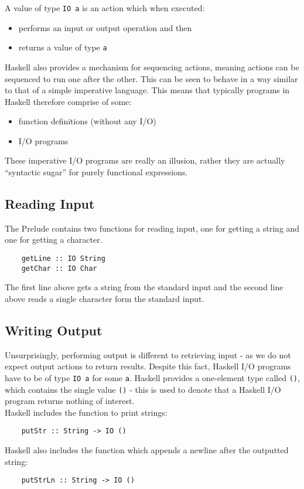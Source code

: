 A value of type \verb|IO a| is an action which when executed:
\begin{itemize}
    \item performs an input or output operation and then
    \item returns a value of type \verb|a|
\end{itemize}
Haskell also provides a mechanism for sequencing actions, meaning actions can be sequenced to run one after the other. This can be seen to behave in a way similar to that of a simple imperative language. This means that typically programs in Haskell therefore comprise of some:
\begin{itemize}
    \item function definitions (without any I/O)
    \item I/O programs
\end{itemize}
These imperative I/O programs are really an illusion, rather they are actually ``syntactic sugar'' for purely functional expressions. 

\subsection{Reading Input}
The Prelude contains two functions for reading input, one for getting a string and one for getting a character. 
\begin{verbatim}
    getLine :: IO String
    getChar :: IO Char
\end{verbatim}
The first line above gets a string from the standard input and the second line above reads a single character form the standard input.

\subsection{Writing Output}
Unsurprisingly, performing output is different to retrieving input - as we do not expect output actions to return results. Despite this fact, Haskell I/O programs have to be of type \verb|IO a| for some \verb|a|. Haskell provides a one-element type called \verb|()|, which contains the single value \verb|()| - this is used to denote that a Haskell I/O program returns nothing of interest.\\

Haskell includes the function to print strings:
\begin{verbatim}
    putStr :: String -> IO ()
\end{verbatim}

Haskell also includes the function which appends a newline after the outputted string:
\begin{verbatim}
    putStrLn :: String -> IO ()
\end{verbatim}

